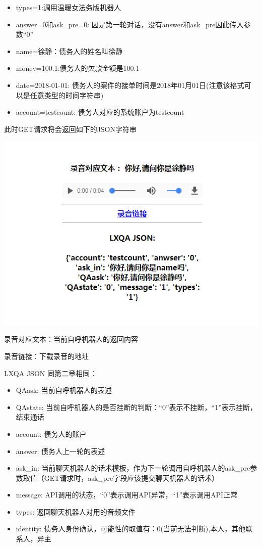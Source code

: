 \documentclass[]{book}
\begin{document}
\begin{itemize}
\item
  types=1:调用温暖女法务版机器人
\item
  answer=0和ask\_pre=0:
  因是第一轮对话，没有answer和ask\_pre因此传入参数``0''
\item
  name=徐静：债务人的姓名叫徐静
\item
  money=100.1:债务人的欠款金额是100.1
\item
  date=2018-01-01:
  债务人的案件的接单时间是2018年01月01日(注意该格式可以是任意类型的时间字符串)
\item
  account=testcount: 债务人对应的系统账户为testcount
\end{itemize}

此时GET请求将会返回如下的JSON字符串

\begin{center}\includegraphics[width=1.5\linewidth,height=1.5\textheight]{img/3-1} \end{center}

录音对应文本：当前自呼机器人的返回内容

录音链接：下载录音的地址

LXQA JSON 同第二章相同：

\begin{itemize}
\item
  QAask: 当前自呼机器人的表述
\item
  QAstate:
  当前自呼机器人的是否挂断的判断：``0''表示不挂断，``1''表示挂断，结束通话
\item
  account: 债务人的账户
\item
  answer: 债务人上一轮的表述
\item
  ask\_in:
  当前聊天机器人的话术模板，作为下一轮调用自呼机器人的ask\_pre参数取值（GET请求时，ask\_pre字段应该提交聊天机器人的话术）
\item
  message: API调用的状态，``0''表示调用API异常，``1''表示调用API正常
\item
  types: 返回聊天机器人对用的音频文件
\item
  identity:
  债务人身份确认，可能性的取值有：0(当前无法判断),本人，其他联系人，异主
\end{itemize}
\end{document}

